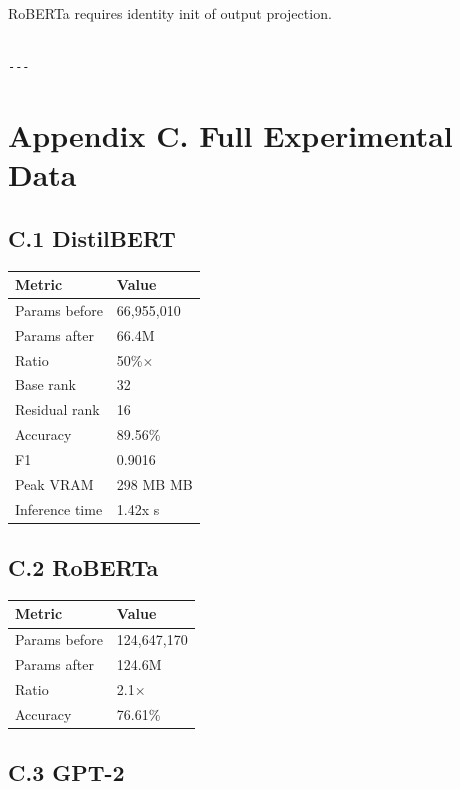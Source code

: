 RoBERTa requires identity init of output projection.
\begin{lstlisting}

---
\end{lstlisting}

\section{Appendix C. Full Experimental Data}

\subsection{C.1 DistilBERT}

\begin{table}[H]
\centering
\small
\begin{tabular}{ll}
\toprule
\textbf{Metric} & \textbf{Value} \\
\midrule
Params before & 66,955,010 \\
Params after & 66.4M \\
Ratio & 50\%$\times$ \\
Base rank & 32 \\
Residual rank & 16 \\
Accuracy & 89.56\% \\
F1 & 0.9016 \\
Peak VRAM & 298 MB MB \\
Inference time & 1.42x s \\
\bottomrule
\end{tabular}
\end{table}

\subsection{C.2 RoBERTa}

\begin{table}[H]
\centering
\small
\begin{tabular}{ll}
\toprule
\textbf{Metric} & \textbf{Value} \\
\midrule
Params before & 124,647,170 \\
Params after & 124.6M \\
Ratio & 2.1$\times$ \\
Accuracy & 76.61\% \\
\bottomrule
\end{tabular}
\end{table}

\subsection{C.3 GPT-2}

